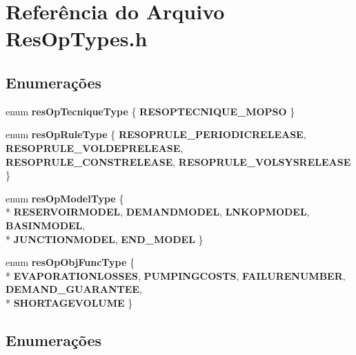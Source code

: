 \section{Referência do Arquivo Res\+Op\+Types.\+h}
\label{_res_op_types_8h}
\subsection*{Enumerações}
\begin{DoxyCompactItemize}
\item 
enum {\bf res\+Op\+Tecnique\+Type} \{ {\bf R\+E\+S\+O\+P\+T\+E\+C\+N\+I\+Q\+U\+E\+\_\+\+M\+O\+P\+SO}
 \}
\item 
enum {\bf res\+Op\+Rule\+Type} \{ {\bf R\+E\+S\+O\+P\+R\+U\+L\+E\+\_\+\+P\+E\+R\+I\+O\+D\+I\+C\+R\+E\+L\+E\+A\+SE}, 
{\bf R\+E\+S\+O\+P\+R\+U\+L\+E\+\_\+\+V\+O\+L\+D\+E\+P\+R\+E\+L\+E\+A\+SE}, 
{\bf R\+E\+S\+O\+P\+R\+U\+L\+E\+\_\+\+C\+O\+N\+S\+T\+R\+E\+L\+E\+A\+SE}, 
{\bf R\+E\+S\+O\+P\+R\+U\+L\+E\+\_\+\+V\+O\+L\+S\+Y\+S\+R\+E\+L\+E\+A\+SE}
 \}
\item 
enum {\bf res\+Op\+Model\+Type} \{ \\*
{\bf R\+E\+S\+E\+R\+V\+O\+I\+R\+M\+O\+D\+EL}, 
{\bf D\+E\+M\+A\+N\+D\+M\+O\+D\+EL}, 
{\bf L\+N\+K\+O\+P\+M\+O\+D\+EL}, 
{\bf B\+A\+S\+I\+N\+M\+O\+D\+EL}, 
\\*
{\bf J\+U\+N\+C\+T\+I\+O\+N\+M\+O\+D\+EL}, 
{\bf E\+N\+D\+\_\+\+M\+O\+D\+EL}
 \}
\item 
enum {\bf res\+Op\+Obj\+Func\+Type} \{ \\*
{\bf E\+V\+A\+P\+O\+R\+A\+T\+I\+O\+N\+L\+O\+S\+S\+ES}, 
{\bf P\+U\+M\+P\+I\+N\+G\+C\+O\+S\+TS}, 
{\bf F\+A\+I\+L\+U\+R\+E\+N\+U\+M\+B\+ER}, 
{\bf D\+E\+M\+A\+N\+D\+\_\+\+G\+U\+A\+R\+A\+N\+T\+EE}, 
\\*
{\bf S\+H\+O\+R\+T\+A\+G\+E\+V\+O\+L\+U\+ME}
 \}
\end{DoxyCompactItemize}


\subsection{Enumerações}
